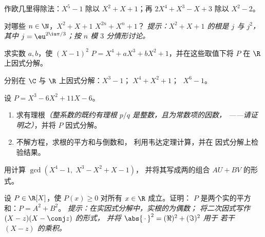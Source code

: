 \begin{exercise}[$\star$]\label{exo:b1:poly:1}
作欧几里得除法：$X^5 - 1$ 除以 $X^2 + X + 1$；再
$2X^4 + X^3 - X + 3$ 除以 $X^2 - 2$。
\end{exercise}

\begin{exercise}[$\star$]\label{exo:b1:poly:2}
对哪些 $n \in \N$，$X^2 + X + 1$  $X^{2n} + X^n + 1$？
\emph{提示：$X^2 + X + 1$ 的根是 $j$ 与 $j^2$，其中 $j =
\eu^{2\iu\pi/3}$；按 $n$ 模 $3$ 分情形讨论。}
\end{exercise}

\begin{exercise}[$\star$]\label{exo:b1:poly:3}
求实数 $a, b$，使 $(X-1)^2$  $P = X^4 + aX^3 +
bX^2 + 1$，并在这些取值下将 $P$ 在 $\R$ 上因式分解。
\end{exercise}

\begin{exercise}[$\star$]\label{exo:b1:poly:4}
分别在 $\C$ 与 $\R$ 上因式分解：$X^3 - 1$；$\;X^4 + X^2 + 1$；
$\;X^6 - 1$。
\end{exercise}

\begin{exercise}[$\star\star$]\label{exo:b1:poly:5}
设 $P = X^3 - 6X^2 + 11X - 6$。
\begin{enumerate}
  \item 求有理根\emph{（整系数的既约有理根 $p/q$
        是整数，且为常数项的因数，
——请证明之）}，并将 $P$ 因式分解。
  \item 不解方程，求根的平方和与倒数和，
        利用韦达定理计算，并在
        因式分解上检验结果。
\end{enumerate}
\end{exercise}

\begin{exercise}[$\star\star$]\label{exo:b1:poly:6}
用计算 $\gcd(X^4 - 1,\; X^3 - X^2 + X - 1)$，
并将其写成两的组合
$AU + BV$ 的形式。
\end{exercise}

\begin{exercise}[$\star\star$]\label{exo:b1:poly:7}
设 $P \in \R[X]$，使 $P(x) \geq 0$ 对所有 $x \in \R$ 成立。证明：
$P$ 是两个实的平方和：$P = A^2 + B^2$。
\emph{提示：在实因式分解中，实根的为偶数；
将二次因式写作 $(X - z)(X - \conj z)$ 的形式，
并将 $\abs{\,\cdot\,}^2 = (\Re)^2 + (\Im)^2$ 用于
若干 $(X - z)$ 的乘积。}
\end{exercise}

